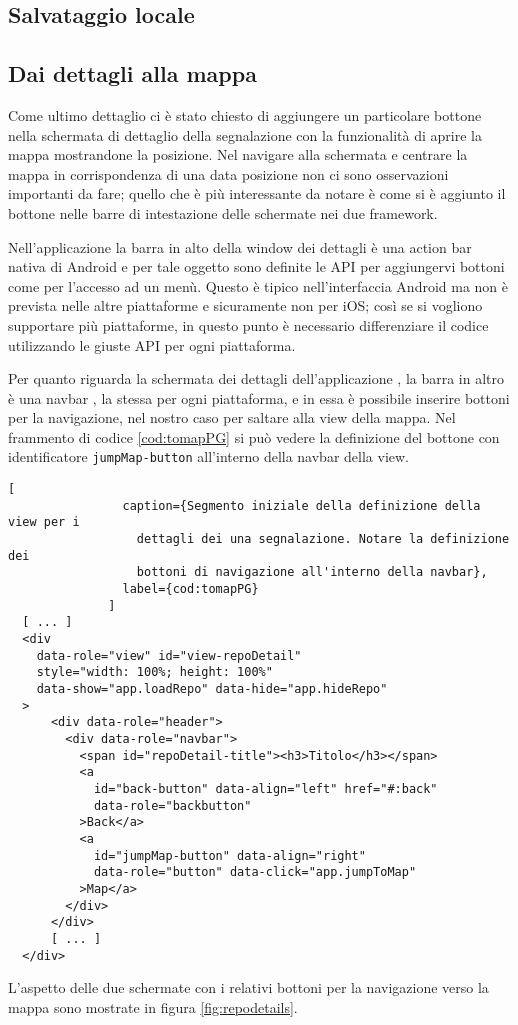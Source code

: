         
        \subsection{Salvataggio locale}
        \label{subsec:caching}
            

        
        \subsection{Dai dettagli alla mappa}
            Come ultimo dettaglio ci è stato chiesto di aggiungere un
            particolare bottone nella schermata di dettaglio della segnalazione
            con la funzionalità di aprire la mappa mostrandone la
            posizione. Nel navigare alla schermata e centrare la mappa in
            corrispondenza di una data posizione non ci sono osservazioni
            importanti da fare; quello che è più interessante da notare è come
            si è aggiunto il bottone nelle barre di intestazione delle schermate
            nei due framework.

            Nell'applicazione \tisdk{} la barra in alto della window dei
            dettagli è una action bar nativa di Android e per tale oggetto sono
            definite le API per aggiungervi bottoni come per l'accesso ad un
            menù. Questo è tipico nell'interfaccia Android ma non è prevista
            nelle altre piattaforme e sicuramente non per iOS; così se si
            vogliono supportare più piattaforme, in questo punto è necessario
            differenziare il codice utilizzando le giuste API per ogni
            piattaforma.
            
            Per quanto riguarda la schermata dei dettagli dell'applicazione
            \pg{}, la barra in altro è una navbar \kendomob{}, la stessa per
            ogni piattaforma, e in essa è possibile inserire bottoni per la
            navigazione, nel nostro caso per saltare alla view della mappa. Nel
            frammento di codice \ref{cod:tomapPG} si può vedere la definizione
            del bottone con identificatore \texttt{jumpMap-button} all'interno
            della navbar della view.
            \begin{lstlisting}[
                caption={Segmento iniziale della definizione della view per i
                  dettagli dei una segnalazione. Notare la definizione dei
                  bottoni di navigazione all'interno della navbar},
                label={cod:tomapPG}
              ]
  [ ... ]
  <div
    data-role="view" id="view-repoDetail"
    style="width: 100%; height: 100%"
    data-show="app.loadRepo" data-hide="app.hideRepo"
  >
      <div data-role="header">
        <div data-role="navbar">
          <span id="repoDetail-title"><h3>Titolo</h3></span>
          <a
            id="back-button" data-align="left" href="#:back"
            data-role="backbutton"
          >Back</a>
          <a
            id="jumpMap-button" data-align="right"
            data-role="button" data-click="app.jumpToMap"
          >Map</a>
        </div>
      </div>
      [ ... ]
  </div>
            \end{lstlisting}

            L'aspetto delle due schermate con i relativi bottoni per la
            navigazione verso la mappa sono mostrate in figura \ref{fig:repodetails}.
